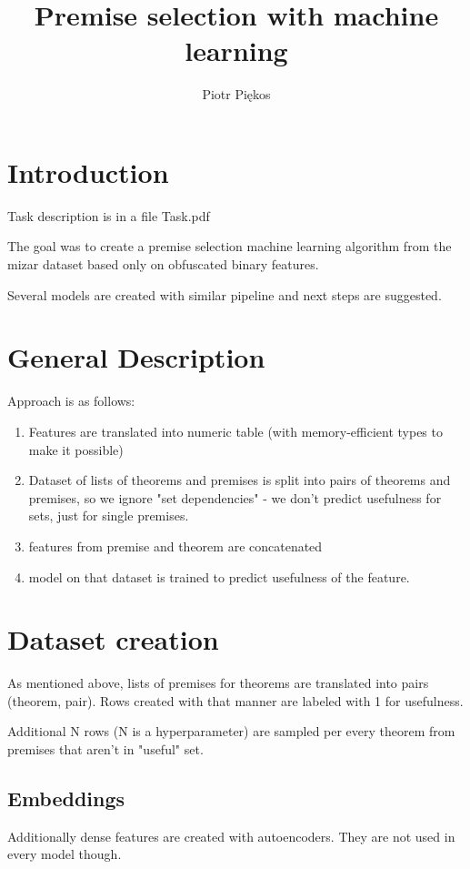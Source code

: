 \documentclass{article} %
\author{Piotr Piękos}
\title{%
Premise selection with machine learning}
\begin{document}
\maketitle

\section{Introduction}

Task description is in a file Task.pdf

 The goal was to create a premise selection machine learning algorithm from the mizar dataset based only on obfuscated binary features. 
 
 Several models are created with similar pipeline and next steps are suggested.
\section{General Description}
	
Approach is as follows:
\begin{enumerate}
\item Features are translated into numeric table (with memory-efficient types to make it possible)
\item Dataset of lists of theorems and premises is split into pairs of theorems and premises, so we ignore "set dependencies" - we don't predict usefulness for sets, just for single premises.
\item features from premise and theorem are concatenated
\item model on that dataset is trained to predict usefulness of the feature.
\end{enumerate}

\section{Dataset creation}

As mentioned above, lists of premises for theorems are translated into pairs (theorem, pair). Rows created with that manner are labeled with 1 for usefulness. 

Additional N rows (N is a hyperparameter) are sampled per every theorem from premises that aren't in "useful" set.

\subsection{Embeddings} 

Additionally dense features are created with autoencoders. They are not used in every model though.
\end{document}
